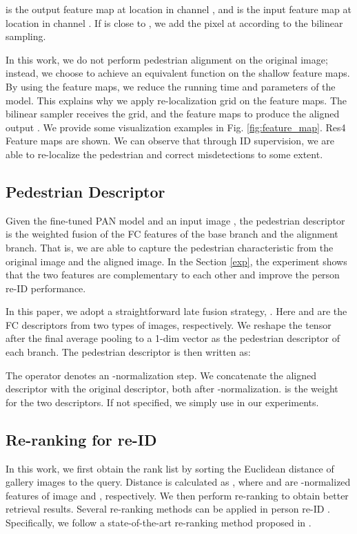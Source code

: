  is the output feature map at location  in channel , and  is the input feature map at location  in channel . If  is close to , we add the pixel at  according to the bilinear sampling.

In this work, we do not perform pedestrian alignment on the original image; instead, we choose to achieve an equivalent function on the shallow feature maps. By using the feature maps,  we reduce the running time and parameters of the model. This explains why we apply re-localization grid on the feature maps. The bilinear sampler receives the grid, and the feature maps to produce the aligned output . We provide some visualization examples in Fig. \ref{fig:feature_map}. Res4 Feature maps are shown. We can observe that through ID supervision, we are able to re-localize the pedestrian and correct misdetections to some extent. 

\subsection{Pedestrian Descriptor} \label{descriptor}
Given the fine-tuned PAN model and an input image , the pedestrian descriptor is the weighted fusion of the FC features of the base branch and the alignment branch. That is, we are able to capture the pedestrian characteristic from the original image and the aligned image. In the Section \ref{exp}, the experiment shows that the two features are complementary to each other and improve the person re-ID performance.

In this paper, we adopt a straightforward late fusion strategy, \ie . Here  and  are the FC descriptors from two types of images, respectively. We reshape the tensor after the final average pooling to a 1-dim vector as the pedestrian descriptor of each branch. The pedestrian descriptor is then written as:

The  operator denotes an -normalization step.
We concatenate the aligned descriptor with the original descriptor, both after -normalization.
 is the weight for the two descriptors. If not specified, we simply use  in our experiments.

\subsection{Re-ranking for re-ID} \label{re-rank}
In this work, we first obtain the rank list  by sorting the Euclidean distance of gallery images to the query. Distance is calculated as , where  and  are -normalized features of image  and , respectively. 
We then perform re-ranking to obtain better retrieval results. Several re-ranking methods can be applied in person re-ID \cite{ye2015ranking,qin2011hello,zhong2017re}. Specifically, we follow a state-of-the-art re-ranking method proposed in \cite{zhong2017re}.

